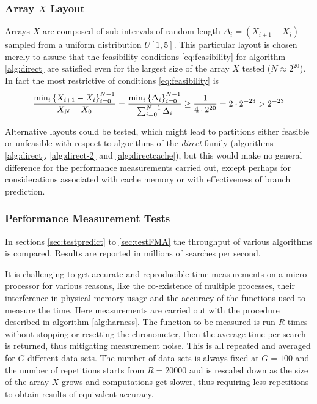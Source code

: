 \documentclass[preprint,1p,times]{elsarticle}
\begin{document}
\subsubsection{Array $X$ Layout}
\label{sec:arrayx} 
Arrays $X$ are composed of sub intervals of random length $\Delta_i=(X_{i+1}-X_i)$ sampled from a uniform distribution $U[1,5]$. This particular layout is chosen merely to assure that the feasibility conditions \eqref{eq:feasibility} for algorithm \ref{alg:direct} are satisfied even for the largest size of the array $X$ tested ($N \approx 2^{20}$). In fact the most restrictive of conditions \eqref{eq:feasibility} is
\begin{align*}
\frac{\min_i\left \{  X_{i+1}-X_{i}  \right \}_{i=0}^{N-1}}{X_N-X_0}
= \frac{\min_i\left \{  \Delta_i  \right \}_{i=0}^{N-1}}{\sum_{i=0}^{N-1}\Delta_i}
\geq \frac{1}{4\cdot 2^{20}}=2\cdot 2^{-23} > 2^{-23}
\end{align*}



Alternative layouts could be tested, which might lead to partitions either feasible or unfeasible with respect to algorithms of the \textit{direct} family (algorithms \ref{alg:direct}, \ref{alg:direct-2} and \ref{alg:directcache}), but this would make no general difference for the performance measurements carried out, except perhaps for considerations associated with cache memory or with effectiveness of branch prediction.

\subsubsection{Performance Measurement Tests}
In sections \ref{sec:testpredict} to \ref{sec:testFMA} the throughput of various algorithms is compared. Results are reported in millions of searches per second.

It is challenging to get accurate and reproducible time measurements on a micro processor for various reasons, like the co-existence of multiple processes, their interference in physical memory usage and the accuracy of the functions used to measure the time. Here measurements are carried out with the procedure described in algorithm \ref{alg:harness}. The function to be measured is run $R$ times without stopping or resetting the chronometer, then the average time per search is returned, thus mitigating measurement noise. This is all repeated and averaged for $G$ different data sets. The number of data sets is always fixed at $G=100$ and the number of repetitions starts from $R=20000$ and is rescaled down as the size of the array $X$ grows and computations get slower, thus requiring less repetitions to obtain results of equivalent accuracy.
\end{document}
